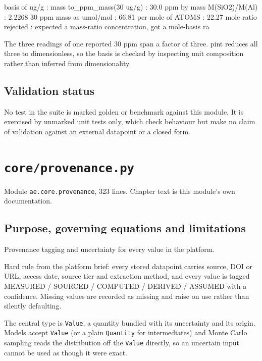 \documentclass[10pt,a4paper,twoside]{report}
\begin{document}
\begin{outputblock}
basis of ug/g           : mass
to_ppm_mass(30 ug/g)    : 30.0 ppm by mass
M(SiO2)/M(Al)           : 2.2268
30 ppm mass as umol/mol : 66.81
per mole of ATOMS       : 22.27
mole ratio rejected     : expected a mass-ratio concentration, got a mole-basis ra
\end{outputblock}

The three readings of one reported 30 ppm span a factor of three. pint reduces all three to dimensionless, so the basis is checked by inspecting unit composition rather than inferred from dimensionality.

\section{Validation status}

No test in the suite is marked golden or benchmark against this module. It is exercised by unmarked unit tests only, which check behaviour but make no claim of validation against an external datapoint or a closed form.

\clearpage

\chapter{\texttt{core/provenance.py}}\label{ch:provenance}


{\footnotesize\color{slate}Module \texttt{ae.core.provenance}, 323 lines. Chapter text is this module's own documentation.\par}

\section{Purpose, governing equations and limitations}

Provenance tagging and uncertainty for every value in the platform.

Hard rule from the platform brief: every stored datapoint carries source, DOI or URL, access date, source tier and extraction method, and every value is tagged MEASURED / SOURCED / COMPUTED / DERIVED / ASSUMED with a confidence. Missing values are recorded as missing and raise on use rather than silently defaulting.

The central type is \texttt{Value}, a quantity bundled with its uncertainty and its origin. Models accept \texttt{Value} (or a plain \texttt{Quantity} for intermediates) and Monte Carlo sampling reads the distribution off the \texttt{Value} directly, so an uncertain input cannot be used as though it were exact.
\end{document}

